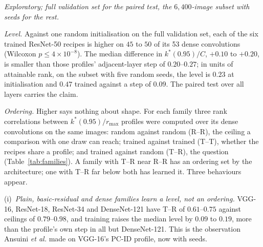 \documentclass[10pt,journal,compsoc]{IEEEtran}
\begin{document}
\emph{Exploratory; full validation set for the paired test, the
$6{,}400$-image subset with seeds for the rest.}\label{sec:trained}

\emph{Level.} Against one random initialisation on the full validation set,
each of the six trained ResNet-50 recipes is higher on $45$ to $50$ of its
53 dense convolutions (Wilcoxon $p \le 4 \times 10^{-8}$). The median
difference in $k^*(0.95)/C$, $+0.10$ to $+0.20$, is smaller than those
profiles' adjacent-layer step of $0.20$--$0.27$; in units of attainable
rank, on the subset with five random seeds, the level is $0.23$ at
initialisation and $0.47$ trained against a step of $0.09$. The paired
test over all layers carries the claim.

\emph{Ordering.} Higher says nothing about shape. For each family three
rank correlations between $k^*(0.95)/r_{\max}$ profiles were computed over
its dense convolutions on the same images: random against random (R--R),
the ceiling a comparison with one draw can reach; trained against trained
(T--T), whether the recipes share a profile; and trained against random
(T--R), the question (Table~\ref{tab:families}). A family with T--R near
R--R has an ordering set by the architecture; one with T--R far below both
has learned it. Three behaviours appear.

\begin{table}[t]
  \centering
  \caption{Is the ordering of layers learned? Median Spearman $\rho$ between
  $k^*(0.95)/r_{\max}$ profiles over a family's $L$ dense convolutions, on the
  same $6{,}400$ images: random-vs-random over $n_R$ seeds, trained-vs-trained
  over $n_T$ checkpoints, and trained-vs-random over all pairs. \emph{Draw}
  is the initialisation of the random networks behind the R columns (last BN
  of each block $\gamma = 1$ for the torchvision draws of ResNet-50, $\gamma = 0$
  for the timm defaults of the other ResNet families); \emph{other draw} is
  T--R against three networks drawn the other way. $T$ and $R$
  are the median levels. Depthwise rows are reported separately. VGG-16's
  two checkpoints are with and without BN. ConvNeXt-T, with four dense
  convolutions, is omitted: a rank correlation over four layers is
  uninformative (Section~\ref{sec:dwsplit}).}
  \label{tab:families}
  \footnotesize
  
\end{table}

(i)~\emph{Plain, basic-residual and dense families learn a level, not an
ordering.} VGG-16, ResNet-18, ResNet-34 and DenseNet-121 have T--R of
$0.61$--$0.75$ against ceilings of $0.79$--$0.98$, and training raises the
median level by $0.09$ to $0.19$, more than the profile's own step in all
but DenseNet-121. This is the observation Ansuini \emph{et al.}
\cite{ansuini2019intrinsic} made on VGG-16's PC-ID profile, now with seeds.
\end{document}

